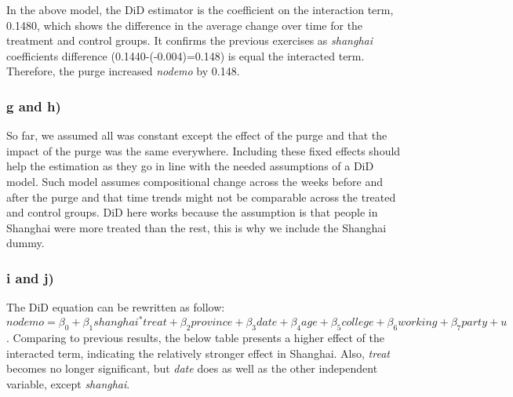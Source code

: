 \documentclass[
]{article}
\begin{document}
In the above model, the DiD estimator is the coefficient on the
interaction term, 0.1480, which shows the difference in the average
change over time for the treatment and control groups. It confirms the
previous exercises as \emph{shanghai} coefficients difference
(0.1440-(-0.004)=0.148) is equal the interacted term. Therefore, the
purge increased \emph{nodemo} by 0.148.

\hypertarget{g-and-h}{%
\subsubsection{g and h)}\label{g-and-h}}

So far, we assumed all was constant except the effect of the purge and
that the impact of the purge was the same everywhere. Including these
fixed effects should help the estimation as they go in line with the
needed assumptions of a DiD model. Such model assumes compositional
change across the weeks before and after the purge and that time trends
might not be comparable across the treated and control groups. DiD here
works because the assumption is that people in Shanghai were more
treated than the rest, this is why we include the Shanghai dummy.

\hypertarget{i-and-j}{%
\subsubsection{i and j)}\label{i-and-j}}

The DiD equation can be rewritten as follow:
\(nodemo = \beta_0 +\beta_1shanghai^*treat + \beta_2province +\beta_3date + \beta_4age + \beta_5college + \beta_6working + \beta_7party +u\).
Comparing to previous results, the below table presents a higher effect
of the interacted term, indicating the relatively stronger effect in
Shanghai. Also, \emph{treat} becomes no longer significant, but
\emph{date} does as well as the other independent variable, except
\emph{shanghai}.
\end{document}
